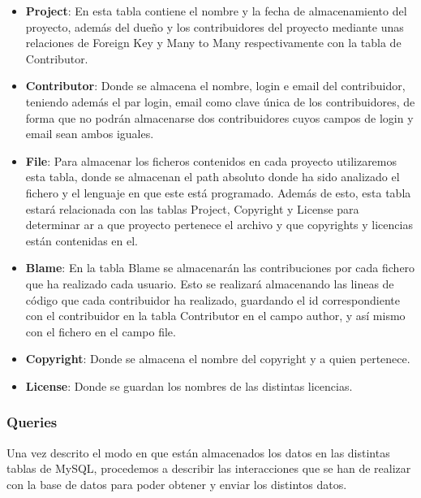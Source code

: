 \documentclass[a4paper, spanish, 12pt]{book}
\begin{document}
\begin{itemize}

\item \textbf{Project}: En esta tabla contiene el nombre y la fecha de almacenamiento
del proyecto, adem\'as del due\~no y los contribuidores del proyecto mediante unas relaciones
de Foreign Key y Many to Many respectivamente con la tabla de Contributor.

\item \textbf{Contributor}: Donde se almacena el nombre, login e email del contribuidor,
teniendo adem\'as el par login, email como clave \'unica de los contribuidores, de forma
que no podr\'an almacenarse dos contribuidores cuyos campos de login y email sean
ambos iguales.

\item \textbf{File}: Para almacenar los ficheros contenidos en cada proyecto
utilizaremos esta tabla, donde se almacenan el path absoluto donde ha sido analizado
el fichero y el lenguaje en que este est\'a programado. Adem\'as de esto, esta tabla
estar\'a relacionada con las tablas Project, Copyright y License para determinar
ar
a que proyecto pertenece el archivo y que copyrights y licencias est\'an contenidas
en el.

\item \textbf{Blame}: En la tabla Blame se almacenar\'an las contribuciones por cada
fichero que ha realizado cada usuario. Esto se realizar\'a almacenando las lineas de
c\'odigo que cada contribuidor ha realizado, guardando el id correspondiente con
el contribuidor en la tabla Contributor en el campo author, y as\'i mismo
con el fichero en el campo file.

\item \textbf{Copyright}: Donde se almacena el nombre del copyright y a quien pertenece.

\item \textbf{License}: Donde se guardan los nombres de las distintas licencias.

\end{itemize}

\subsubsection*{Queries}
\label{subsubsec:queries}

Una vez descrito el modo en que est\'an almacenados los datos en las distintas
tablas de MySQL, procedemos a describir las interacciones que se han de realizar
con la base de datos para poder obtener y enviar los distintos datos.
\end{document}
